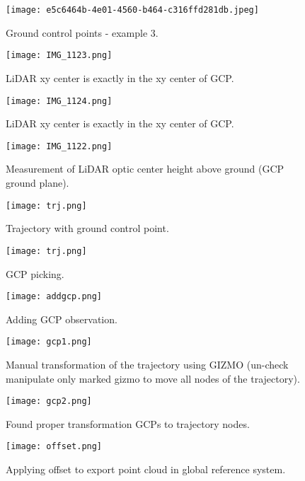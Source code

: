 \begin{figure}[H]
	\centering
	\texttt{[image: e5c6464b-4e01-4560-b464-c316ffd281db.jpeg]}
	\caption{Ground control points - example 3.}
	\label{fig:GCP3}
\end{figure}

\begin{figure}[H]
	\centering
	\texttt{[image: IMG\_1123.png]}
	\caption{LiDAR xy center is exactly in the xy center of GCP.}
	\label{fig:GCP4}
\end{figure}

\begin{figure}[H]
	\centering
	\texttt{[image: IMG\_1124.png]}
	\caption{LiDAR xy center is exactly in the xy center of GCP.}
	\label{fig:GCP5}
\end{figure}

\begin{figure}[H]
	\centering
	\texttt{[image: IMG\_1122.png]}
	\caption{Measurement of LiDAR optic center height above ground (GCP ground plane).}
	\label{fig:GCP6}
\end{figure}

\begin{figure}[H]
	\centering
	\texttt{[image: trj.png]}
	\caption{Trajectory with ground control point. }
	\label{fig:trj}
\end{figure}

\begin{figure}[H]
	\centering
	\texttt{[image: trj.png]}
	\caption{GCP picking.}
	\label{fig:picking}
\end{figure}

\begin{figure}[H]
	\centering
	\texttt{[image: addgcp.png]}
	\caption{Adding GCP observation.}
	\label{fig:addgcp}
\end{figure}

\begin{figure}[H]
	\centering
	\texttt{[image: gcp1.png]}
	\caption{Manual transformation of the trajectory using GIZMO (un-check manipulate only marked gizmo to move all nodes of the trajectory).}
	\label{fig:gcp1}
\end{figure}

\begin{figure}[H]
	\centering
	\texttt{[image: gcp2.png]}
	\caption{Found proper transformation GCPs to trajectory nodes.}
	\label{fig:gcp2}
\end{figure}

\begin{figure}[H]
	\centering
	\texttt{[image: offset.png]}
	\caption{Applying offset to export point cloud in global reference system.}
	\label{fig:offset}
\end{figure}


